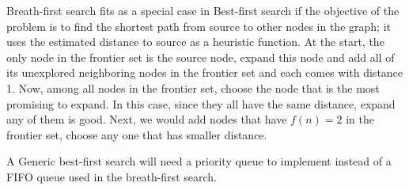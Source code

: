 \documentclass[main.tex]{subfiles}
\begin{document}
 Breath-first search fits as  a special case in Best-first search if the objective of the problem is to find the shortest path from source to other nodes in the graph; it uses the estimated distance to source as a heuristic function.  At the start, the only node in the frontier set is the source node, expand this node and add all of its unexplored neighboring nodes in the frontier set and each comes with distance 1. Now, among all nodes in the frontier set, choose the node that is the most promising to expand. In this case, since they all have the same distance, expand any of them is good. Next, we would add nodes that have $f(n)=2$ in the frontier set, choose any one that has smaller distance. 
 
 A Generic best-first search will need a priority queue to implement instead of a FIFO queue used in the breath-first search. 
\end{document}

